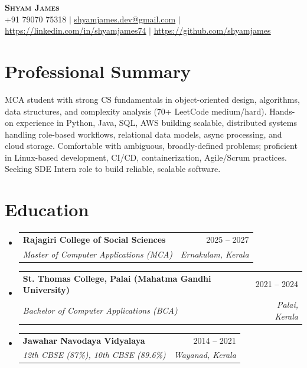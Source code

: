 \documentclass[a4paper,11pt]{article}
\makeatletter
\newcommand{\resumeSubheading}[4]{
  \vspace{-2pt}\item
    \begin{tabular*}{0.97\textwidth}[t]{l@{\extracolsep{\fill}}r}
      \textbf{#1} & #2 \\
      \textit{\small#3} & \textit{\small #4} \\
    \end{tabular*}\vspace{-7pt}
}
\newcommand{\resumeSubHeadingListStart}{\begin{itemize}[leftmargin=0.15in, label={}]}
\newcommand{\resumeSubHeadingListEnd}{\end{itemize}}
\makeatother
\begin{document}
\begin{center}
    \textbf{\Huge \scshape Shyam James} \\ \vspace{5pt}
    \small +91 79070 75318 $|$ \href{mailto:shyamjames.dev@gmail.com}{\underline{shyamjames.dev@gmail.com}} $|$ 
    \href{https://linkedin.com/in/shyamjames74}{\underline{https://linkedin.com/in/shyamjames74}} $|$
    \href{https://github.com/shyamjames}{\underline{https://github.com/shyamjames}}
\end{center}

\section{Professional Summary}
\vspace{2pt}
\small{MCA student with strong CS fundamentals in object-oriented design, algorithms, data structures, and complexity analysis (70+ LeetCode medium/hard). Hands-on experience in Python, Java, SQL, AWS building scalable, distributed systems handling role-based workflows, relational data models, async processing, and cloud storage. Comfortable with ambiguous, broadly-defined problems; proficient in Linux-based development, CI/CD, containerization, Agile/Scrum practices. Seeking SDE Intern role to build reliable, scalable software.}

\section{Education}
  \resumeSubHeadingListStart
    \resumeSubheading
      {Rajagiri College of Social Sciences}{2025 -- 2027}
      {Master of Computer Applications (MCA)}{Ernakulam, Kerala}
    \resumeSubheading
      {St. Thomas College, Palai (Mahatma Gandhi University)}{2021 -- 2024}
      {Bachelor of Computer Applications (BCA)}{Palai, Kerala}
    \resumeSubheading
      {Jawahar Navodaya Vidyalaya}{2014 -- 2021}
      {12th CBSE (87\%), 10th CBSE (89.6\%)}{Wayanad, Kerala}
  \resumeSubHeadingListEnd

\end{document}
